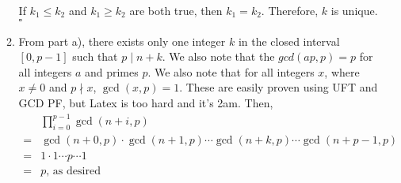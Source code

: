 \documentclass[10pt]{article}
\begin{document}
\begin{enumerate}
\begin{enumerate}
    If $k_1 \leq k_2$ and $k_1 \geq k_2$ are both true, then $k_1 = k_2$. Therefore, $k$ is unique. $\square$
    \item
    From part a), there exists only one integer $k$ in the closed interval $[0, p-1]$ such that $p \mid n + k$. We also note that the $gcd{(ap, p)} = p$ for all integers $a$ and primes $p$. We also note that for all integers $x$, where $x \neq 0$ and $p \nmid x$, $\gcd{(x, p)} = 1$. These are easily proven using UFT and GCD PF, but Latex is too hard and it's 2am. Then,
    \begin{align*}
        &\prod_{i=0}^{p-1}\gcd{(n+i, p)}\\
        =&\gcd{(n+0, p)} \cdot \gcd{(n+1, p)} \cdots \gcd(n+k, p) \cdots \gcd{(n+p-1, p)}\\
        =&1 \cdot 1  \cdots p \cdots 1\\
        =& p \text{, as desired}
    \end{align*}
    \end{enumerate}
    
    
    



\end{enumerate}
\end{document}
